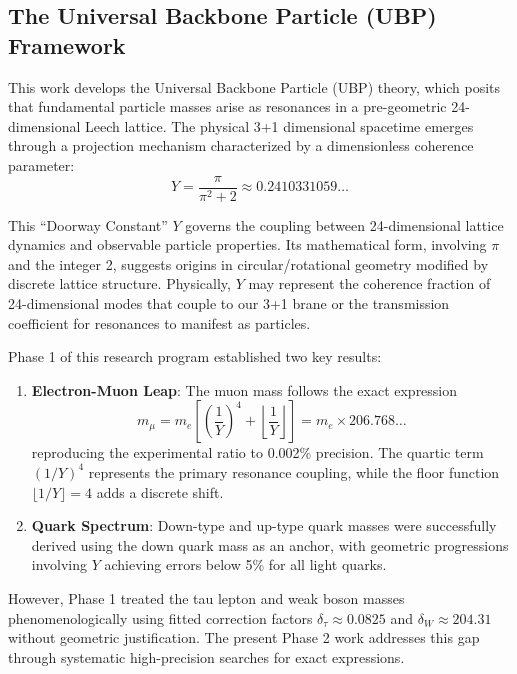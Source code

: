 \documentclass[11pt,a4paper]{article}
\begin{document}
\subsection{The Universal Backbone Particle (UBP) Framework}

This work develops the Universal Backbone Particle (UBP) theory, which posits that fundamental particle masses arise as resonances in a pre-geometric 24-dimensional Leech lattice. The physical 3+1 dimensional spacetime emerges through a projection mechanism characterized by a dimensionless coherence parameter:
\begin{equation}
Y = \frac{\pi}{\pi^2 + 2} \approx 0.2410331059\ldots
\label{eq:doorway_constant}
\end{equation}

This ``Doorway Constant'' $Y$ governs the coupling between 24-dimensional lattice dynamics and observable particle properties. Its mathematical form, involving $\pi$ and the integer 2, suggests origins in circular/rotational geometry modified by discrete lattice structure. Physically, $Y$ may represent the coherence fraction of 24-dimensional modes that couple to our 3+1 brane or the transmission coefficient for resonances to manifest as particles.

Phase 1 of this research program established two key results:
\begin{enumerate}
\item \textbf{Electron-Muon Leap}: The muon mass follows the exact expression
\begin{equation}
m_\mu = m_e \left[ \left(\frac{1}{Y}\right)^4 + \left\lfloor \frac{1}{Y} \right\rfloor \right] = m_e \times 206.768\ldots
\label{eq:muon_mass}
\end{equation}
reproducing the experimental ratio to 0.002\% precision. The quartic term $(1/Y)^4$ represents the primary resonance coupling, while the floor function $\lfloor 1/Y \rfloor = 4$ adds a discrete shift.

\item \textbf{Quark Spectrum}: Down-type and up-type quark masses were successfully derived using the down quark mass as an anchor, with geometric progressions involving $Y$ achieving errors below 5\% for all light quarks.
\end{enumerate}

However, Phase 1 treated the tau lepton and weak boson masses phenomenologically using fitted correction factors $\delta_\tau \approx 0.0825$ and $\delta_W \approx 204.31$ without geometric justification. The present Phase 2 work addresses this gap through systematic high-precision searches for exact expressions.
\end{document}
